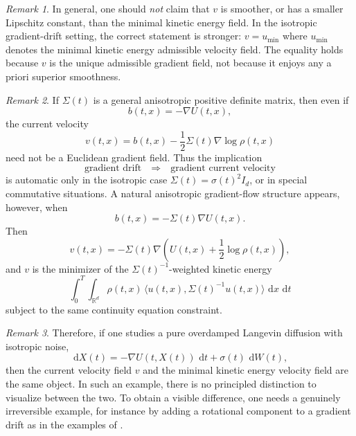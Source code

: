 \documentclass[oneside,11pt]{article}
\theoremstyle{remark}
\newtheorem{remark}{Remark}
\begin{document}
\begin{remark}
In general, one should \emph{not} claim that \(v\) is smoother, or has a smaller Lipschitz constant, than the minimal kinetic energy field. In the isotropic gradient-drift setting, the correct statement is stronger: $v = u_{\mathrm{min}}$
where \(u_{\mathrm{min}}\) denotes the minimal kinetic energy admissible velocity field. The equality holds because \(v\) is the unique admissible gradient field, not because it enjoys any a priori superior smoothness.
\end{remark}

\begin{remark}
If \(\Sigma(t)\) is a general anisotropic positive definite matrix, then even if
\[
b(t,x) = -\nabla U(t,x),
\]
the current velocity
\[
v(t,x)=b(t,x)-\frac12 \Sigma(t)\nabla \log \rho(t,x)
\]
need not be a Euclidean gradient field. Thus the implication
\[
\text{gradient drift} \quad \Longrightarrow \quad \text{gradient current velocity}
\]
is automatic only in the isotropic case \(\Sigma(t)=\sigma(t)^2 I_d\), or in special commutative situations. A natural anisotropic gradient-flow structure appears, however, when
\[
b(t,x) = -\Sigma(t)\nabla U(t,x).
\]
Then
\begin{equation*}
    v(t,x)
    = -\Sigma(t)\nabla\!\left(U(t,x)+\frac12 \log \rho(t,x)\right),
\end{equation*}
and \(v\) is the minimizer of the \(\Sigma(t)^{-1}\)-weighted kinetic energy
\begin{equation*}
    \int_0^T \int_{\mathbb{R}^d} \rho(t,x)\, \langle u(t,x),  \Sigma(t)^{-1} u(t,x) \rangle\,\,\mathrm{d} x\,\,\mathrm{d} t
\end{equation*}
subject to the same continuity equation constraint.
\end{remark}

\begin{remark}
Therefore, if one studies a pure overdamped Langevin diffusion with isotropic noise,
\[
\,\mathrm{d} X(t) = -\nabla U(t,X(t))\,\,\mathrm{d} t + \sigma(t)\,\,\mathrm{d} W(t),
\]
then the current velocity field \(v\) and the minimal kinetic energy velocity field are the same object. In such an example, there is no principled distinction to visualize between the two. To obtain a visible difference, one needs a genuinely irreversible example, for instance by adding a rotational component to a gradient drift as in the examples of .
\end{remark}
\end{document}
